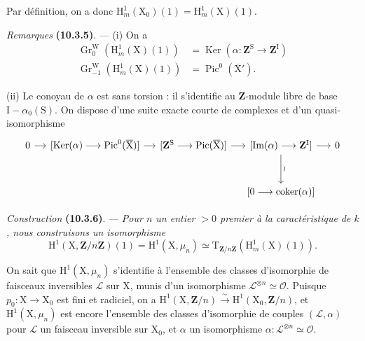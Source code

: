 \documentclass[11pt,leqno]{article}
\begin{document}
Par définition, on a donc \(\mathrm{H}^{1}_{m}(\mathrm{X}_0)(1)=\mathrm{H}^{1}_{m}(\mathrm{X})(1)\).

\textit{Remarques} \textbf{(10.3.5)}. — (i) On a
\[
\begin{aligned}
\operatorname{Gr}^{\mathrm{W}}_0(\mathrm{H}^{1}_{m}(\mathrm{X})(1))
  &=\operatorname{Ker}(\alpha:\mathbf{Z}^{\mathrm{S}}\to\mathbf{Z}^{\mathrm{I}})\\
\operatorname{Gr}^{\mathrm{W}}_{-1}(\mathrm{H}^{1}_{m}(\mathrm{X})(1))
  &=\operatorname{Pic}^{0}(\overline{\mathrm{X}}').
\end{aligned}
\]

(ii) Le conoyau de \(\alpha\) est sans torsion : il s’identifie au \(\mathbf{Z}\)-module libre de base \(\mathrm{I}-\alpha_0(\mathrm{S})\). On dispose d’une suite exacte courte de complexes et d’un quasi-isomorphisme
\[
\begin{tikzcd}[column sep=small,row sep=3em]
0 \arrow[r]
 & {[\operatorname{Ker}(\alpha)\longrightarrow
       \operatorname{Pic}^{0}(\overline{\mathrm{X}})]} \arrow[r]
 & {[\mathbf{Z}^{\mathrm{S}}\longrightarrow
       \operatorname{Pic}(\overline{\mathrm{X}})]} \arrow[r]
 & {[\operatorname{Im}(\alpha)\longrightarrow\mathbf{Z}^{\mathrm{I}}]}
       \arrow[r] \arrow[d,"\wr"]
 & 0 \\
 & & & {[0\longrightarrow\operatorname{coker}(\alpha)]} &
\end{tikzcd}
\]

\textit{Construction} \textbf{(10.3.6)}. — \textit{Pour \(n\) un entier \(>0\) premier à la caractéristique de \(k\), nous construisons un isomorphisme}
\[
\mathrm{H}^{1}(\mathrm{X},\mathbf{Z}/n\mathbf{Z})(1)
=\mathrm{H}^{1}(\mathrm{X},\mu_n)
\simeq
\mathrm{T}_{\mathbf{Z}/n\mathbf{Z}}(\mathrm{H}^{1}_{m}(\mathrm{X})(1)).
\]

On sait que \(\mathrm{H}^{1}(\mathrm{X},\mu_n)\) s’identifie à l’ensemble des classes d’isomorphie de faisceaux inversibles \(\mathcal{L}\) sur \(\mathrm{X}\), munis d’un isomorphisme \(\mathcal{L}^{\otimes n}\simeq\mathcal{O}\). Puisque \(p_0:\mathrm{X}\to\mathrm{X}_0\) est fini et radiciel, on a \(\mathrm{H}^{1}(\mathrm{X},\mathbf{Z}/n)\xrightarrow{\sim}\mathrm{H}^{1}(\mathrm{X}_0,\mathbf{Z}/n)\), et \(\mathrm{H}^{1}(\mathrm{X},\mu_n)\) est encore l’ensemble des classes d’isomorphie de couples \((\mathcal{L},\alpha)\) pour \(\mathcal{L}\) un faisceau inversible sur \(\mathrm{X}_0\), et \(\alpha\) un isomorphisme \(\alpha:\mathcal{L}^{\otimes n}\simeq\mathcal{O}\).
\end{document}
